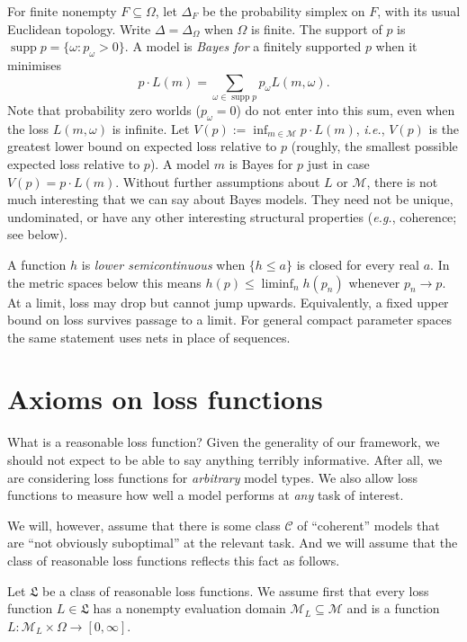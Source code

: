 \documentclass[11pt]{article}
\theoremstyle{definition}
\theoremstyle{remark}
\newcommand{\M}{\mathcal M}
\newcommand{\C}{\mathcal C}
\newcommand{\supp}{\operatorname{supp}}
\begin{document}
For finite nonempty $F\subseteq\Omega$, let $\Delta_F$ be the probability simplex on $F$, with its usual Euclidean topology. Write $\Delta=\Delta_\Omega$ when $\Omega$ is finite. The support of $p$ is $\supp p=\{\omega:p_\omega>0\}$. A model is \emph{Bayes for} a finitely supported $p$ when it minimises
\[
 p\cdot L(m)=\sum_{\omega\in\supp p}p_\omega L(m,\omega).
\]
Note that probability zero worlds ($p_\omega=0$) do not enter into this sum, even when the loss $L(m,\omega)$ is infinite. Let $V(p):=\inf_{m\in\M}p\cdot L(m)$, \textit{i.e.}, $V(p)$ is the greatest lower bound on expected loss relative to $p$ (roughly, the smallest possible expected loss relative to $p$). A model $m$ is Bayes for $p$ just in case $V(p)=p\cdot L(m)$. Without further assumptions about $L$ or $\M$, there is not much interesting that we can say about Bayes models. They need not be unique, undominated, or have any other interesting structural properties (\textit{e.g.}, coherence; see below).


A function $h$ is \emph{lower semicontinuous} when $\{h\le a\}$ is closed for every real $a$. In the metric spaces below this means $h(p)\le\liminf_n h(p_n)$ whenever $p_n\to p$. At a limit, loss may drop but cannot jump upwards. Equivalently, a fixed upper bound on loss survives passage to a limit. For general compact parameter spaces the same statement uses nets in place of sequences.



\section{Axioms on loss functions}\label{sec:axioms}

What is a reasonable loss function? Given the generality of our framework, we should not expect to be able to say anything terribly informative. After all, we are considering loss functions for \textit{arbitrary} model types. We also allow loss functions to measure how well a model performs at \textit{any} task of interest.



We will, however, assume that there is some class $\C$ of ``coherent'' models that are ``not obviously suboptimal'' at the relevant task. And we will assume that the class of reasonable loss functions reflects this fact as follows. 


Let $\mathfrak L$ be a class of reasonable loss functions. We assume first that every loss function $L\in\mathfrak L$ has a nonempty evaluation domain $\M_L\subseteq\M$ and is a function $L:\M_L\times\Omega\to[0,\infty]$. 
\end{document}
